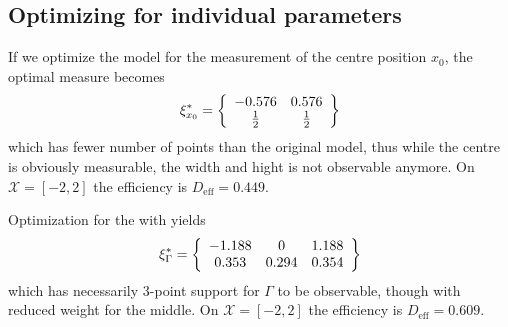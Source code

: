 \documentclass[12pt]{iopart}
\begin{document}
\subsection{Optimizing for individual parameters}

If we optimize the model  for the measurement of the centre position $x_0$, the optimal measure becomes
\begin{equation}
\xi^*_{x_0} = \left\{ 
  \begin{array}{c c}
    -0.576 & 0.576 \\
    \frac{1}{2} & \frac{1}{2}\\
  \end{array} \right \}
\end{equation}
which has fewer number of points than the original model, thus while the centre is obviously measurable, the width and hight is not observable anymore.  On $\mathcal{X} = [-2,2]$ the efficiency is $D_\mathrm{eff} = 0.449$.

Optimization for the with yields
\begin{equation}
\xi^*_{\Gamma} = \left\{ 
  \begin{array}{c c c}
    -1.188 & 0 &  1.188 \\
    0.353 & 0.294 & 0.354\\
  \end{array} \right \}
\end{equation}
which has necessarily 3-point support for $\Gamma$ to be observable, though with reduced weight for the middle. On $\mathcal{X} = [-2,2]$ the efficiency is $D_\mathrm{eff} = 0.609$.
\end{document}
